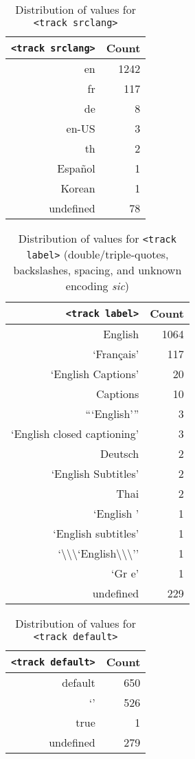 \documentclass{sig-alternate}
\makeatletter
\newcommand\unknown{%
  \sbox\Diam@nd{\raisebox{-1ex}{\scalebox{1}[1.2]{\rotatebox{45}{\rule{0.8em}{0.8em}}}}}%
  \makebox[\wd\Diam@nd]{\makebox[0pt]{\usebox\Diam@nd}\makebox[0pt]{\textcolor{white}{?}}}}
\makeatother
\begin{document}
\begin{table}[p]
  \centering
  \begin{tabular}{ r | r }                       
    \texttt{<track srclang>} & Count \\
    \hline  
    en & 1242\\
    fr & 117\\
    de & 8\\    
    en-US & 3\\
    th & 2\\
    Español & 1\\
    Korean & 1\\
    undefined & 78\\    
  \end{tabular}
  \caption{Distribution of values for
    \texttt{<track srclang>}}
  \label{table:srclang}    
\end{table}

\begin{table}[p]
  \centering
  \begin{tabular}{ r | r }                       
    \texttt{<track label>} & Count \\
    \hline  
    English & 1064\\
    `Français' & 117\\    
    `English Captions' & 20\\    
    Captions & 10\\
    ```English''' & 3\\    
    `English closed captioning' & 3\\    
    Deutsch & 2\\    
    `English Subtitles' & 2\\
    Thai & 2\\    
    `English ' & 1\\
    `English subtitles' & 1\\
    `\textbackslash\textbackslash\textbackslash`English\textbackslash\textbackslash\textbackslash'' & 1\\
    `Gr\unknown\unknown e' & 1\\
    undefined & 229\\
  \end{tabular}
  \caption{Distribution of values for
    \texttt{<track label>} \tiny (double/triple-quotes,
    backslashes, spacing, and unknown encoding
    \emph{sic})}
  \label{table:label}    
\end{table}
  
\begin{table}[p]
  \centering
  \begin{tabular}{ r | r }                       
    \texttt{<track default>} & Count \\
    \hline
    default & 650\\
    `' & 526\\
    true & 1\\
    undefined & 279
  \end{tabular}
  \caption{Distribution of values for
    \texttt{<track default>}}
  \label{table:default}    
\end{table}
\end{document}
